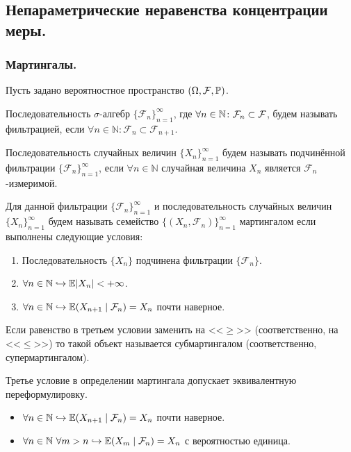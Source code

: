 \subsection{Непараметрические неравенства концентрации меры.}
\subsubsection{Мартингалы.}
Пусть задано вероятностное пространство $(\Omega, \mathcal{F}, \P)$.

\begin{definition}
    Последовательность $\sigma$-алгебр $\{\mathcal{F}_n\}_{n = 1}^{\infty}$, где $\forall n \in \N\colon \mathcal{F}_n \subset \mathcal{F}$, будем называть фильтрацией, если $\forall n \in \mathbb{N} \colon \mathcal{F}_n \subset \mathcal{F}_{n + 1}$.
\end{definition}
\begin{definition}
    Последовательность случайных величин $\{X_n\}_{n = 1}^{\infty}$ будем называть подчинённой фильтрации $\{\mathcal{F}_n\}_{n = 1}^{\infty}$, если $\forall n \in \mathbb{N}$ случайная величина $X_n$ является $\mathcal{F}_n$-измеримой.
\end{definition}
\begin{definition}
    Для данной фильтрации $\{\mathcal{F}_n\}_{n = 1}^{\infty}$ и последовательность случайных величин $\{X_n\}_{n = 1}^{\infty}$ будем называть семейство $\{(X_n, \mathcal{F}_n)\}_{n = 1}^{\infty}$ мартингалом если выполнены следующие условия:
    \begin{enumerate}
        \item Последовательность $\{X_n\}$ подчинена фильтрации $\{\mathcal{F}_n\}$.
        \item $\forall n \in \mathbb{N} \hookrightarrow \Ex |X_n| < +\infty$.
        \item $\forall n \in \mathbb{N} \hookrightarrow \Ex(X_{n + 1} \mid \mathcal{F}_n) = X_n$ почти наверное.
    \end{enumerate}
\end{definition}
\begin{note}
    Если равенство в третьем условии заменить на <<$\geq$>> (соответственно, на <<$\leq$>>) то такой объект называется субмартингалом (соответственно, супермартингалом).
\end{note}
\begin{lemma}
    Третье условие в определении мартингала допускает эквивалентную переформулировку.
    \begin{itemize}
        \item[3] $\forall n \in \mathbb{N} \hookrightarrow \Ex(X_{n + 1} \mid \mathcal{F}_n) = X_n$ почти наверное.
        \item[3'] $\forall n \in \mathbb{N} \  \forall m > n \hookrightarrow \Ex(X_{m} \mid \mathcal{F}_n) = X_n$ с вероятностью единица.
    \end{itemize}
\end{lemma}
